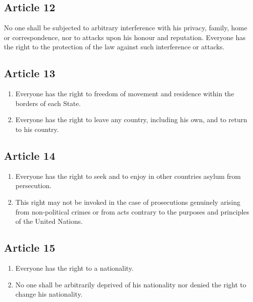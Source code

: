 \documentclass[
  ngerman,
  american,
  titlepage,
  openright,
  DIV=calc,
  toc=listof,
  listof=nochaptergap]{scrbook}
\begin{document}
\subsection{Article 12}\label{article-12-2}

No one shall be subjected to arbitrary interference with his privacy,
family, home or correspondence, nor to attacks upon his honour and
reputation. Everyone has the right to the protection of the law against
such interference or attacks.

\subsection{Article 13}\label{article-13-2}

\begin{enumerate}
\def\labelenumi{\arabic{enumi}.}
\item
  Everyone has the right to freedom of movement and residence within the
  borders of each State.
\item
  Everyone has the right to leave any country, including his own, and to
  return to his country.
\end{enumerate}

\subsection{Article 14}\label{article-14-2}

\begin{enumerate}
\def\labelenumi{\arabic{enumi}.}
\item
  Everyone has the right to seek and to enjoy in other countries asylum
  from persecution.
\item
  This right may not be invoked in the case of prosecutions genuinely
  arising from non-political crimes or from acts contrary to the
  purposes and principles of the United Nations.
\end{enumerate}

\subsection{Article 15}\label{article-15-2}

\begin{enumerate}
\def\labelenumi{\arabic{enumi}.}
\item
  Everyone has the right to a nationality.
\item
  No one shall be arbitrarily deprived of his nationality nor denied the
  right to change his nationality.
\end{enumerate}
\end{document}
